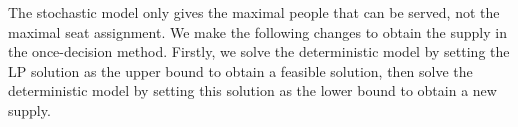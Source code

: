 


The stochastic model only gives the maximal people that can be served, not the maximal seat assignment. We make the following changes to obtain the supply in the once-decision method.
Firstly, we solve the deterministic model by setting the LP solution as the upper bound to obtain a feasible solution, then solve the deterministic model by setting this solution as the lower bound to obtain a new supply.

